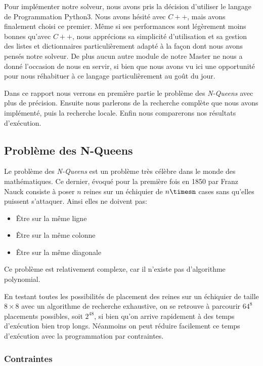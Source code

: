 \documentclass{article}
\begin{document}
Pour implémenter notre solveur, nous avons pris la décision d'utiliser le langage de Programmation Python3. Nous avons hésité avec $C++$, mais avons finalement choisi ce premier. Même si ses performances sont légèrement moins bonnes qu'avec $C++$, nous apprécions sa simplicité d’utilisation et sa gestion des listes et dictionnaires particulièrement adapté à la façon dont nous avons pensés notre solveur. De plus aucun autre module de notre Master ne nous a donné l’occasion de nous en servir, si bien que nous avons vu ici une opportunité pour nous réhabituer à ce langage particulièrement au goût du jour.

Dans ce rapport nous verrons en première partie le problème des \emph{N-Queens} avec plus de précision. Ensuite nous parlerons de la recherche complète que nous avons implémenté, puis la recherche locale. Enfin nous comparerons nos résultats d'exécution. 


\vspace{1cm}

\subsection{Problème des N-Queens}

Le problème des \emph{N-Queens} est un problème très célèbre dans le monde des mathématiques. Ce dernier, évoqué pour la première fois en 1850 par Franz Nauck consiste à poser $n$ reines sur un échiquier de $n\timesn$ cases sans qu'elles puissent s'attaquer. Ainsi elles ne doivent pas: 
\begin{itemize}
\item Être sur la même ligne
\item Être sur la même colonne
\item Être sur la même diagonale
\end{itemize}

Ce problème est relativement complexe, car il n'existe pas d'algorithme polynomial.


En testant toutes les possibilités de placement des reines sur un échiquier de taille $8\times8$ avec un algorithme de recherche exhaustive, on se retrouve à parcourir $64^8$ placements possibles, soit $2^{48}$, si bien qu'on arrive rapidement à des temps d'exécution bien trop longs. Néanmoins on peut réduire facilement ce temps d'exécution avec la programmation par contraintes. 


\subsubsection{Contraintes}
\end{document}
